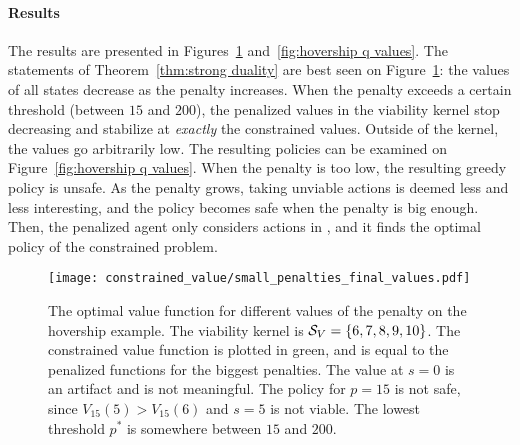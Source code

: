 \paragraph{Results} The results are presented in Figures~\ref{fig:hovership values comparison} and~\ref{fig:hovership q values}. The statements of Theorem~\ref{thm:strong duality} are best seen on Figure~\ref{fig:hovership values comparison}: the values of all states decrease as the penalty increases. When the penalty exceeds a certain threshold (between $15$ and $200$), the penalized values in the viability kernel stop decreasing and stabilize at\emph{ exactly} the constrained values. Outside of the kernel, the values go arbitrarily low. The resulting policies can be examined on Figure~\ref{fig:hovership q values}. When the penalty is too low, the resulting greedy policy is unsafe. As the penalty grows, taking unviable actions is deemed less and less interesting, and the policy becomes safe when the penalty is big enough. Then, the penalized agent only considers actions in \QV, and it finds the optimal policy of the constrained problem.
\begin{figure}
	\centering
	\texttt{[image: constrained\_value/small\_penalties\_final\_values.pdf]}
	\caption{The optimal value function for different values of the penalty on the hovership example. The viability kernel is ${\mathcal{S}_{V}}=\{6, 7, 8, 9, 10\}$. The constrained value function is plotted in green, and is equal to the penalized functions for the biggest penalties. The value at $s=0$ is an artifact and is not meaningful. The policy for $p=15$ is not safe, since $V_{15}(5) > V_{15}(6)$ and $s=5$ is not viable. The lowest threshold $p^*$ is somewhere between $15$ and $200$.}
	\label{fig:hovership values comparison}
\end{figure}
